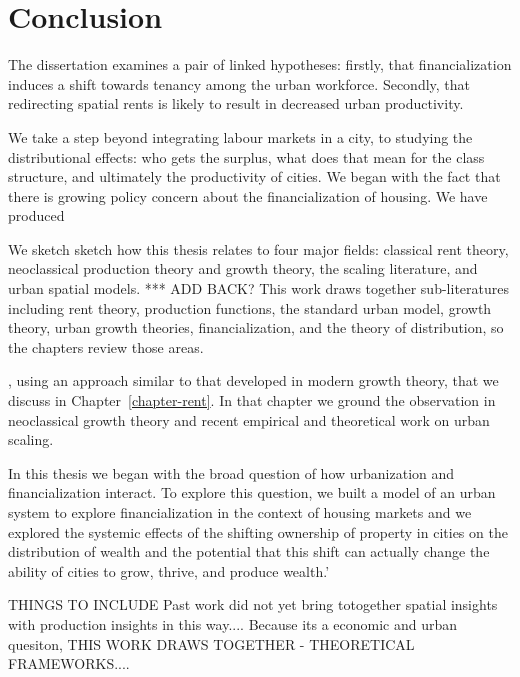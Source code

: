 \chapter{Conclusion} \label{chapter-conclusions}

The dissertation examines a pair of linked hypotheses: firstly, that financialization induces a shift towards tenancy among the urban workforce.  Secondly, that redirecting spatial rents is likely to result in decreased urban productivity. 

 We take a step beyond integrating labour markets in a city, to studying the distributional effects: who gets the surplus, what does that mean for the class structure, and ultimately the productivity of cities. 
We began with the fact that there is growing policy concern about the financialization of  housing. We have produced 


     We sketch sketch how this thesis relates to four major fields: classical rent theory, neoclassical production theory and growth theory, the scaling literature, and urban spatial models. %
    *** ADD BACK? This work draws together sub-literatures including rent theory, production functions, the standard urban model, growth theory, urban growth theories, financialization, and the theory of distribution, so the chapters review those areas. %

    , using an approach similar to that developed in modern growth theory, that we discuss in Chapter~\ref{chapter-rent}.  In that chapter we ground the observation in  \gls{neoclassical growth theory} and recent empirical and theoretical work on \gls{urban scaling}. 


In this thesis we began with the broad question of how urbanization and financialization interact. To explore this question, we built a model of an urban system to explore financialization in the context of housing markets and we explored the systemic effects of the shifting ownership of property in cities on the distribution of wealth and the potential that this shift can actually change the ability of cities to grow, thrive, and produce wealth.'


THINGS TO INCLUDE
Past work did not yet bring totogether spatial insights with production insights in this way.... Because its a economic and urban quesiton, THIS WORK DRAWS TOGETHER - THEORETICAL FRAMEWORKS....

